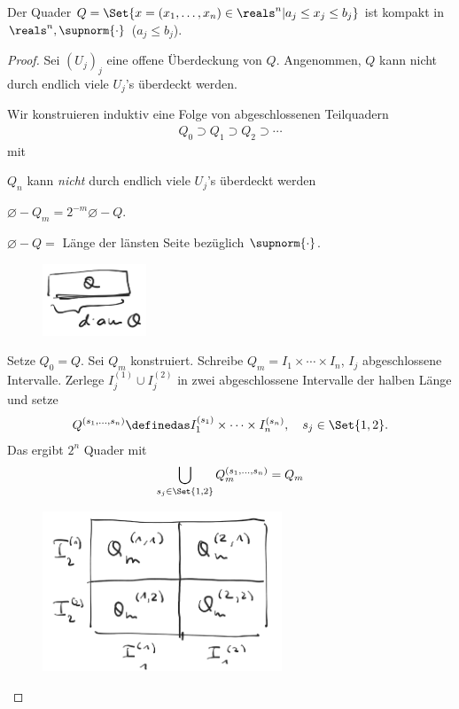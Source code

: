 \begin{lemma}\label{quader_ist_kompakt_norm_undendlich}
    Der Quader \( Q=\Set{x=(x_1,\dotsc, x_n)\in \reals^n| a_j\leq x_j\leq b_j} \) ist kompakt in \( \reals^n,\supnorm{\cdot} \) (\( a_j\leq b_j \)).
\end{lemma}
\begin{proof}
    Sei \( (U_j)_j \) eine offene Überdeckung von \( Q \). Angenommen, \( Q \) kann nicht durch endlich viele \( U_j \)'s überdeckt werden.

    Wir konstruieren induktiv eine Folge von abgeschlossenen Teilquadern
    \begin{align*}
        Q_0\supset Q_1\supset Q_2\supset \dotsb
    \end{align*}
    mit
    \begin{eigenschaftenenumerate}
        \item \( Q_n \) kann \emph{nicht} durch endlich viele \( U_j \)'s überdeckt werden
        \item \( \diameter-{Q_m}=2^{-m}\diameter-{Q} \).
    \end{eigenschaftenenumerate}
     \( \diameter-{Q}= \) Länge der länsten Seite bezüglich \( \supnorm{\cdot} \).
    \begin{figure}[H]
        \centering
        \includegraphics[width=0.3\linewidth]{figures/diameter_quader_norm_unendlich}
        \label{fig:diameter_quader_norm_unendlich}
    \end{figure}
    Setze \( Q_0=Q \). Sei \( Q_m \) konstruiert. Schreibe \( Q_m=I_1\times\dotsb\times I_n \), \( I_j \) abgeschlossene Intervalle. Zerlege \( I_j^{(1)}\cup I_j^{(2)} \) in zwei abgeschlossene Intervalle der halben Länge und setze
    \begin{align*}
        Q^{(s_1,\dotsc,s_n)}\definedas I_1^{(s_1)}\times\dotsb\times I_n^{(s_n)},\quad s_j\in \Set{1,2}.
    \end{align*}
    Das ergibt \( 2^n \) Quader mit
    \begin{align*}
        \bigcup_{s_j\in \Set{1,2}}Q_m^{(s_1,\dotsc,s_n)}=Q_m
    \end{align*}
    \begin{figure}[H]
        \centering
        \includegraphics[width=0.5\linewidth]{figures/teilquader}

\end{figure}
\end{proof}
